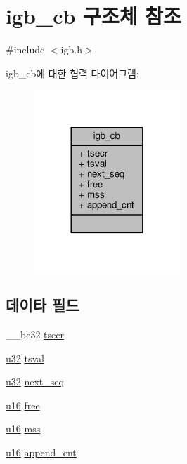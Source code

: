 \hypertarget{structigb__cb}{}\section{igb\+\_\+cb 구조체 참조}
\label{structigb__cb}


{\ttfamily \#include $<$igb.\+h$>$}



igb\+\_\+cb에 대한 협력 다이어그램\+:
\nopagebreak
\begin{figure}[H]
\begin{center}
\leavevmode
\includegraphics[width=156pt]{structigb__cb__coll__graph}
\end{center}
\end{figure}
\subsection*{데이타 필드}
\begin{DoxyCompactItemize}
\item 
\+\_\+\+\_\+be32 \hyperlink{structigb__cb_aface93a372a36f1a47ba2ee21ad56f92}{tsecr}
\item 
\hyperlink{lib_2igb_2e1000__osdep_8h_a64e91c10a0d8fb627e92932050284264}{u32} \hyperlink{structigb__cb_a2c84d9464c4cf8456af401e0fd86d8f8}{tsval}
\item 
\hyperlink{lib_2igb_2e1000__osdep_8h_a64e91c10a0d8fb627e92932050284264}{u32} \hyperlink{structigb__cb_a852338c2885d19f26893336dad9e8e26}{next\+\_\+seq}
\item 
\hyperlink{lib_2igb_2e1000__osdep_8h_acdc9cf0314be0ae5a01d6d4379a95edd}{u16} \hyperlink{structigb__cb_a24de8aeebd1f3d6f108fd2af030181ca}{free}
\item 
\hyperlink{lib_2igb_2e1000__osdep_8h_acdc9cf0314be0ae5a01d6d4379a95edd}{u16} \hyperlink{structigb__cb_a5a39225232f88c889685cc7054ee1ee6}{mss}
\item 
\hyperlink{lib_2igb_2e1000__osdep_8h_acdc9cf0314be0ae5a01d6d4379a95edd}{u16} \hyperlink{structigb__cb_af22de63020dfb0f793d6977597ccf2f1}{append\+\_\+cnt}
\end{DoxyCompactItemize}


